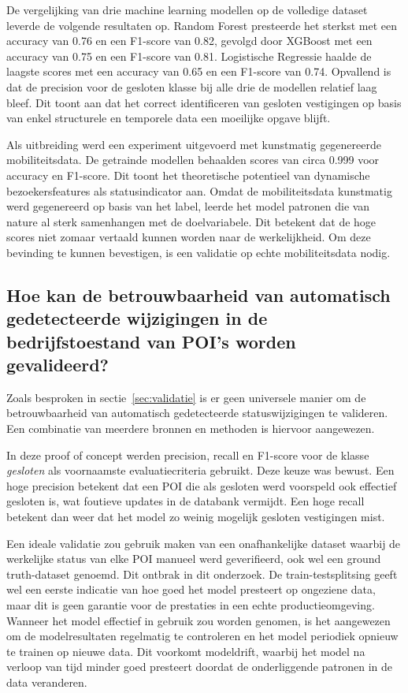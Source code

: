 De vergelijking van drie machine learning modellen op de volledige dataset leverde de volgende resultaten op. Random Forest presteerde het sterkst met een accuracy van 0.76 en een F1-score van 0.82, gevolgd door XGBoost met een accuracy van 0.75 en een F1-score van 0.81. Logistische Regressie haalde de laagste scores met een accuracy van 0.65 en een F1-score van 0.74. Opvallend is dat de precision voor de gesloten klasse bij alle drie de modellen relatief laag bleef. Dit toont aan dat het correct identificeren van gesloten vestigingen op basis van enkel structurele en temporele data een moeilijke opgave blijft.

Als uitbreiding werd een experiment uitgevoerd met kunstmatig gegenereerde mobiliteitsdata. De getrainde modellen behaalden scores van circa 0.999 voor accuracy en F1-score. Dit toont het theoretische potentieel van dynamische bezoekersfeatures als statusindicator aan. Omdat de mobiliteitsdata kunstmatig werd gegenereerd op basis van het label, leerde het model patronen die van nature al sterk samenhangen met de doelvariabele. Dit betekent dat de hoge scores niet zomaar vertaald kunnen worden naar de werkelijkheid. Om deze bevinding te kunnen bevestigen, is een validatie op echte mobiliteitsdata nodig.

\subsection{Hoe kan de betrouwbaarheid van automatisch gedetecteerde wijzigingen in de bedrijfstoestand van POI's worden gevalideerd?}
Zoals besproken in sectie~\ref{sec:validatie} is er geen universele manier om de betrouwbaarheid van automatisch gedetecteerde statuswijzigingen te valideren. Een combinatie van meerdere bronnen en methoden is hiervoor aangewezen.

In deze proof of concept werden precision, recall en F1-score voor de klasse \textit{gesloten} als voornaamste evaluatiecriteria gebruikt. Deze keuze was bewust. Een hoge precision betekent dat een POI die als gesloten werd voorspeld ook effectief gesloten is, wat foutieve updates in de databank vermijdt. Een hoge recall betekent dan weer dat het model zo weinig mogelijk gesloten vestigingen mist.

Een ideale validatie zou gebruik maken van een onafhankelijke dataset waarbij de werkelijke status van elke POI manueel werd geverifieerd, ook wel een ground truth-dataset genoemd. Dit ontbrak in dit onderzoek. De train-testsplitsing geeft wel een eerste indicatie van hoe goed het model presteert op ongeziene data, maar dit is geen garantie voor de prestaties in een echte productieomgeving. Wanneer het model effectief in gebruik zou worden genomen, is het aangewezen om de modelresultaten regelmatig te controleren en het model periodiek opnieuw te trainen op nieuwe data. Dit voorkomt modeldrift, waarbij het model na verloop van tijd minder goed presteert doordat de onderliggende patronen in de data veranderen.

